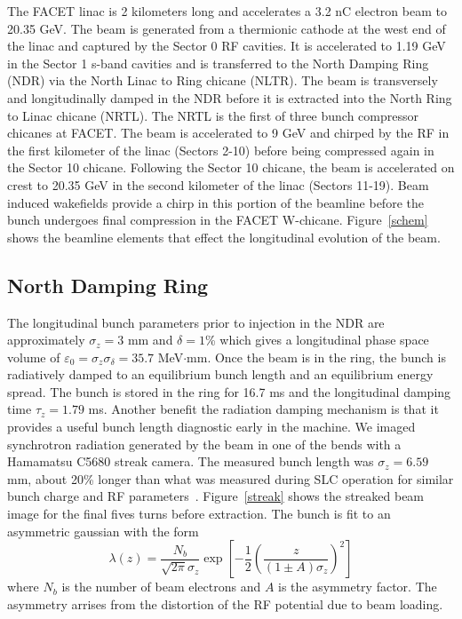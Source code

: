 \documentclass[%
twocolumn,
showpacs,preprintnumbers,
 aps,
prstab,
]{revtex4-1}
\begin{document}
The FACET linac is 2 kilometers long and accelerates a 3.2 nC electron beam to 20.35 GeV. The beam is generated from a thermionic cathode at the west end of the linac and captured by the Sector 0 RF cavities. It is accelerated to 1.19 GeV in the Sector 1 s-band cavities and is transferred to the North Damping Ring (NDR) via the North Linac to Ring chicane (NLTR). The beam is transversely and longitudinally damped in the NDR before it is extracted into the North Ring to Linac chicane (NRTL). The NRTL is the first of three bunch compressor chicanes at FACET. The beam is accelerated to 9 GeV and chirped by the RF in the first kilometer of the linac (Sectors 2-10) before being compressed again in the Sector 10 chicane. Following the Sector 10 chicane, the beam is accelerated on crest to 20.35 GeV in the second kilometer of the linac (Sectors 11-19). Beam induced wakefields provide a chirp in this portion of the beamline before the bunch undergoes final compression in the FACET W-chicane. Figure~\ref{schem} shows the beamline elements that effect the longitudinal evolution of the beam.

\subsection{North Damping Ring}

The longitudinal bunch parameters prior to injection in the NDR are approximately $\sigma_z = 3$ mm and $\delta = 1$\% which gives a longitudinal phase space volume of $\varepsilon_{0} = \sigma_z \sigma_{\delta} = 35.7$ MeV$\cdot$mm. Once the beam is in the ring, the bunch is radiatively damped to an equilibrium bunch length and an equilibrium energy spread. The bunch is stored in the ring for 16.7 ms and the longitudinal damping time $\tau_z = 1.79$ ms. Another benefit the radiation damping mechanism is that it provides a useful bunch length diagnostic early in the machine. We imaged synchrotron radiation generated by the beam in one of the bends with a Hamamatsu C5680 streak camera. The measured bunch length was $\sigma_z = 6.59$ mm, about 20\% longer than what was measured during SLC operation for similar bunch charge and RF parameters~\cite{Holtzapple}. Figure~\ref{streak} shows the streaked beam image for the final fives turns before extraction. The bunch is fit to an asymmetric gaussian with the form
\begin{equation}
 \lambda(z) = \frac{N_b}{\sqrt{2\pi}\sigma_z}\exp{ \left[-\frac{1}{2}\left(\frac{z}{(1\pm A)\sigma_z}\right)^2\right]}
\end{equation}
where $N_b$ is the number of beam electrons and $A$ is the asymmetry factor. The asymmetry arrises from the distortion of the RF potential due to beam loading.
\end{document}
